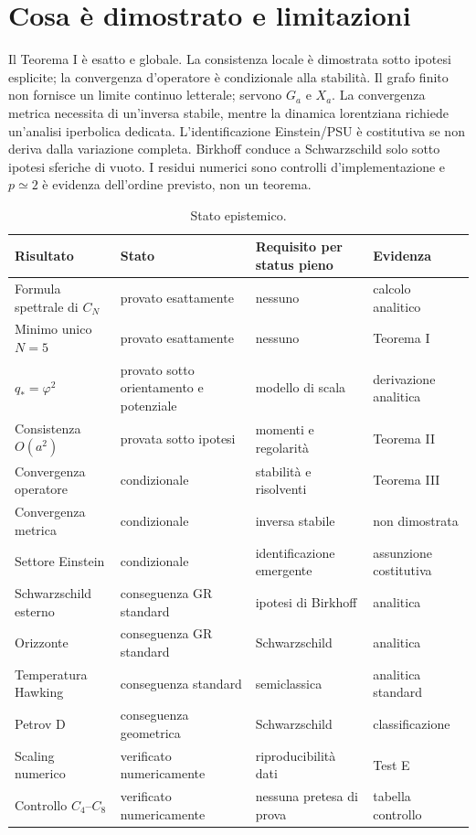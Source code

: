 \documentclass[11pt,a4paper]{article}
\begin{document}
\section{Cosa è dimostrato e limitazioni}
Il Teorema I è esatto e globale. La consistenza locale è dimostrata sotto ipotesi esplicite; la convergenza d'operatore è condizionale alla stabilità. Il grafo finito non fornisce un limite continuo letterale; servono $G_a$ e $X_a$. La convergenza metrica necessita di un'inversa stabile, mentre la dinamica lorentziana richiede un'analisi iperbolica dedicata. L'identificazione Einstein/PSU è costitutiva se non deriva dalla variazione completa. Birkhoff conduce a Schwarzschild solo sotto ipotesi sferiche di vuoto. I residui numerici sono controlli d'implementazione e $p\simeq2$ è evidenza dell'ordine previsto, non un teorema.
\begin{table}[p]\centering\caption{Stato epistemico.}\small\begin{tabular}{p{.25\linewidth}p{.2\linewidth}p{.28\linewidth}p{.2\linewidth}}\toprule Risultato&Stato&Requisito per status pieno&Evidenza\\\midrule Formula spettrale di $C_N$&provato esattamente&nessuno&calcolo analitico\\ Minimo unico $N=5$&provato esattamente&nessuno&Teorema I\\ $q_*=\varphi^2$&provato sotto orientamento e potenziale&modello di scala&derivazione analitica\\ Consistenza $O(a^2)$&provata sotto ipotesi&momenti e regolarità&Teorema II\\ Convergenza operatore&condizionale&stabilità e risolventi&Teorema III\\ Convergenza metrica&condizionale&inversa stabile&non dimostrata\\ Settore Einstein&condizionale&identificazione emergente&assunzione costitutiva\\ Schwarzschild esterno&conseguenza GR standard&ipotesi di Birkhoff&analitica\\ Orizzonte&conseguenza GR standard&Schwarzschild&analitica\\ Temperatura Hawking&conseguenza standard&semiclassica&analitica standard\\ Petrov D&conseguenza geometrica&Schwarzschild&classificazione\\ Scaling numerico&verificato numericamente&riproducibilità dati&Test E\\ Controllo $C_4$--$C_8$&verificato numericamente&nessuna pretesa di prova&tabella controllo\\\bottomrule\end{tabular}\end{table}
\end{document}

